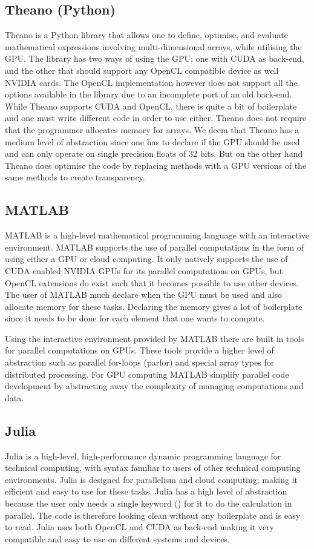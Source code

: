 \subsection{Theano (Python)}
Theano is a Python library that allows one to define, optimise, and evaluate mathematical expressions involving multi-dimensional arrays, while utilising the GPU.
The library has two ways of using the GPU; one with CUDA as back-end, and the other that should support any OpenCL compatible device as well NVIDIA cards.
The OpenCL implementation however does not support all the options available in the library due to an incomplete port of an old back-end.
While Theano supports CUDA and OpenCL, there is quite a bit of boilerplate and one must write different code in order to use either.
Theano does not require that the programmer allocates memory for arrays.
We deem that Theano has a medium level of abstraction since one has to declare if the GPU should be used and can only operate on single precision floats of 32 bits.
But on the other hand Theano does optimise the code by replacing methods with a GPU versions of the same methods to create transparency.\citep{Theano,Theano_GPU}

\subsection{MATLAB}
MATLAB is a high-level mathematical programming language with an interactive environment.
MATLAB supports the use of parallel computations in the form of using either a GPU or cloud computing.
It only natively supports the use of CUDA enabled NVIDIA GPUs for its parallel computations on GPUs, but OpenCL extensions do exist such that it becomes possible to use other devices.
The user of MATLAB much declare when the GPU must be used and also allocate memory for these tasks.
Declaring the memory gives a lot of boilerplate since it needs to be done for each element that one wants to compute.\citep{MATLAB_backend,MATLAB_benchmark,}

Using the interactive environment provided by MATLAB there are built in tools for parallel computations on GPUs.
These tools provide a higher level of abstraction such as parallel for-loops (parfor) and special array types for distributed processing.
For GPU computing MATLAB simplify parallel code development by abstracting away the complexity of managing computations and data.\citep{MATLAB_parallel}

\subsection{Julia}
Julia is a high-level, high-performance dynamic programming language for technical computing, with syntax familiar to users of other technical computing environments.
Julia is designed for parallelism and cloud computing; making it efficient and easy to use for these tasks.
Julia has a high level of abstraction because the user only needs a single keyword (\@parallel) for it to do the calculation in parallel.
The code is therefore looking clean without any boilerplate and is easy to read.
Julia uses both OpenCL and CUDA as back-end making it very compatible and easy to use on different systems and devices.\citep{Julia_Git,Julia}

